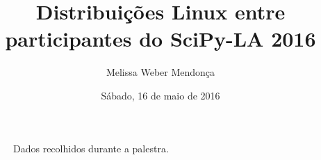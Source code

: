 \documentclass{article}
\title{Distribuições Linux entre participantes do SciPy-LA 2016}
\author{Melissa Weber Mendonça}
\date{Sábado, 16 de maio de 2016}
\begin{document}
\maketitle
\newcommand{\slice}[5]{\pgfmathparse{0.5*#1+0.5*#2}\let\midangle\pgfmathresult 
\draw[thick,fill=blue!#5!white] (0,0) -- (#1:1) arc (#1:#2:1) -- cycle;
\node[label=\midangle:#4] at (\midangle:1) {};
\pgfmathparse{min((#2-#1-10)/110*(-0.3),0)} \let\temp\pgfmathresult \pgfmathparse{max(\temp,-0.5) + 0.8} \let\innerpos\pgfmathresult \node[rectangle] at (\midangle:\innerpos) {#3};}
\begin{figure}[ht]
\begin{center}
\end{center}
\caption{Dados recolhidos durante a palestra.}
\end{figure}
\end{document}
